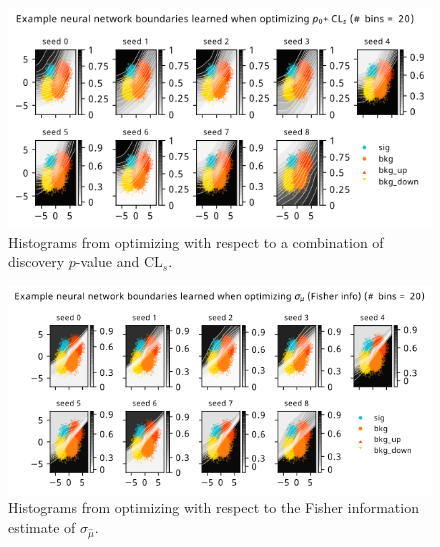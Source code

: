 \documentclass[
  11pt,
  numbers=noendperiod]{book}
\begin{document}
\begin{figure}

{\centering \includegraphics{./images/new-grid-models-COMB-20bin.png}

}

\caption{Histograms from optimizing with respect to a combination of
discovery \(p\)-value and \(\mathrm{CL}_s\).}

\end{figure}

\begin{figure}

{\centering \includegraphics{./images/new-grid-models-poi_uncert-20bin.png}

}

\caption{Histograms from optimizing with respect to the Fisher
information estimate of \(\sigma_{\hat{\mu}}\).}

\end{figure}
\end{document}
